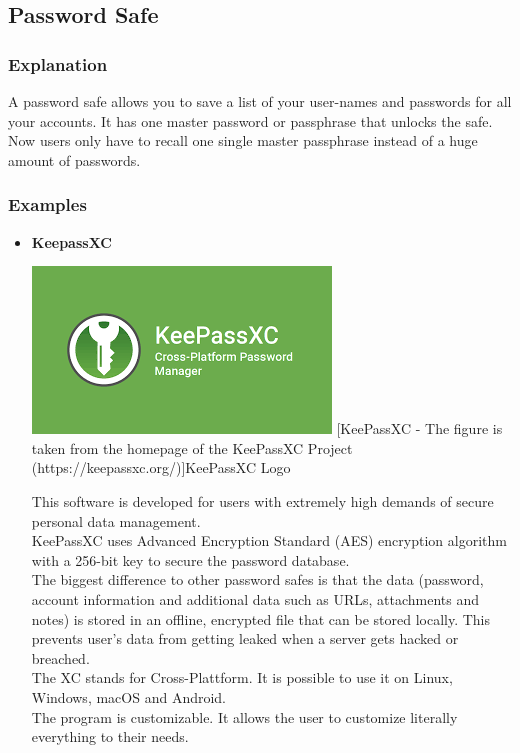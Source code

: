 \documentclass[conference]{IEEEtran}
\begin{document}
\subsection{Password Safe}
\subsubsection{Explanation}
A password safe allows you to save a list of your user-names and passwords for all your accounts. It has one master password or passphrase that unlocks the safe. Now users only have to recall one single master passphrase instead of a huge amount of passwords.
\subsubsection{Examples}
\begin{itemize}
\item \textbf{KeepassXC}\cite{b6}\\ 
\begin{center}
\includegraphics[scale=0.6]{./images/KeePass.png}
[KeePassXC - The figure is taken from the homepage of the KeePassXC Project (https://keepassxc.org/)]{KeePassXC Logo}
\end{center}

This software is developed for users with extremely high demands of secure personal data management. \\
KeePassXC uses Advanced Encryption Standard (AES) encryption algorithm with a 256-bit key to secure the password database.\\
The biggest difference to other password safes is that the data (password, account information and additional data such as URLs, attachments and notes) is stored in an offline, encrypted file that can be stored locally. This prevents user's data from getting leaked when a server gets hacked or breached.\\
The XC stands for Cross-Plattform. It is possible to use it on Linux, Windows, macOS and Android.\\
The program is customizable. It allows the user to customize literally everything to their needs.\\



\end{itemize}
\end{document}
